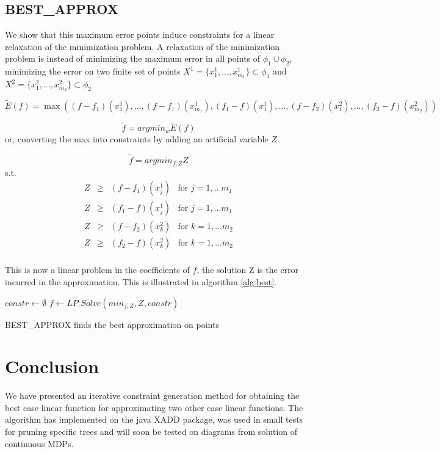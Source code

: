 \subsection{BEST\_APPROX}
We show that this maximum error points induce constraints for a linear relaxation of the minimization problem.
A relaxation of the minimization problem is instead of minimizing the maximum error in all points of $\phi_1 \cup \phi_2$, minimizing the error on two finite set of points $X^1 = \{ x^1_1, ..., x^1_{m_1} \} \subset   \phi_1$ and $X^2 = \{ x^2_1, ..., x^2_{m_2} \} \subset   \phi_2$
	
$$ \tilde{E}(f) =\max \left( (f - f_1) (x^1_1), ... , (f - f_1) (x^1_{m_1}),  (f _1- f) (x^1_1), ... ,  (f - f_2) (x^2_1), ... , (f_2 - f) (x^2_{m_2})
\right)$$


$$\tilde{f} = argmin_w \tilde{E}(f) $$
or, converting the max into constraints by adding an artificial variable $Z$.

$$\tilde{f} = argmin_{f,Z}  Z $$
s.t. 
$$
	\begin{array}{llll}
		Z & \geq & (f - f_1) (x^1_j) & \mbox{for } j = 1,...m_1\\
		Z & \geq & (f_1 - f) (x^1_j) & \mbox{for } j = 1,...m_1\\
		Z & \geq & (f - f_2) (x^2_k) & \mbox{for } k = 1,...m_2\\
		Z & \geq & (f_2 - f) (x^2_k) & \mbox{for } k = 1,...m_2\\
	\end{array}
$$

This is now a linear problem in the coefficients of $f$, the solution Z is the error incurred in the approximation. This is illustrated in algorithm \ref{alg:best}.

\begin{algorithm}[!h]
\dontprintsemicolon
{}
$constr \gets \emptyset$\;
\;
$f \gets LP\_Solve(min_{f,Z}, Z, constr)$\;	
\;
\caption{{\sc BEST\_APPROX} finds the best approximation on points}
\label{alg:best}
\end{algorithm}

\section{Conclusion}
We have presented an iterative constraint generation method for obtaining the best case linear function for approximating two other case linear functions. The algorithm has implemented on the java XADD package, was used in small tests for pruning specific trees and will soon be tested on diagrams from solution of continuous MDPs. 
\newpage
\appendix
